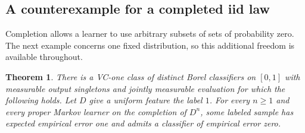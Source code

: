 \documentclass[11pt]{article}
\newtheorem{theorem}{Theorem}[section]
\theoremstyle{definition}\newtheorem{definition}[theorem]{Definition}
\begin{document}
\subsection{A counterexample for a completed iid law}

Completion allows a learner to use arbitrary subsets of sets of probability
zero. The next example concerns one fixed distribution, so this additional
freedom is available throughout.

\begin{theorem}\label{thm:null-chain}
There is a VC-one class of distinct Borel classifiers on $[0,1]$ with
measurable output singletons and jointly measurable evaluation for which the
following holds. Let $D$ give a uniform feature the label $1$. For every
$n\ge1$ and every proper Markov learner on the completion of $D^n$, some
labeled sample has expected empirical error one and admits a classifier of
empirical error zero.
\end{theorem}
\end{document}
